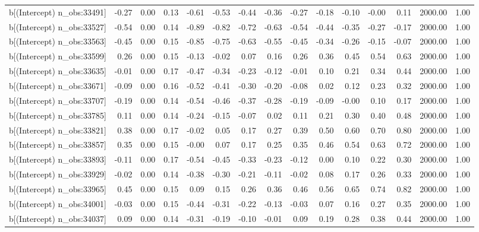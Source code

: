 \begin{table}[ht]
\begin{tabular}{rrrrrrrrrrrrrrr}
  b[(Intercept) n\_obs:33491] & -0.27 & 0.00 & 0.13 & -0.61 & -0.53 & -0.44 & -0.36 & -0.27 & -0.18 & -0.10 & -0.00 & 0.11 & 2000.00 & 1.00 \\ 
  b[(Intercept) n\_obs:33527] & -0.54 & 0.00 & 0.14 & -0.89 & -0.82 & -0.72 & -0.63 & -0.54 & -0.44 & -0.35 & -0.27 & -0.17 & 2000.00 & 1.00 \\ 
  b[(Intercept) n\_obs:33563] & -0.45 & 0.00 & 0.15 & -0.85 & -0.75 & -0.63 & -0.55 & -0.45 & -0.34 & -0.26 & -0.15 & -0.07 & 2000.00 & 1.00 \\ 
  b[(Intercept) n\_obs:33599] & 0.26 & 0.00 & 0.15 & -0.13 & -0.02 & 0.07 & 0.16 & 0.26 & 0.36 & 0.45 & 0.54 & 0.63 & 2000.00 & 1.00 \\ 
  b[(Intercept) n\_obs:33635] & -0.01 & 0.00 & 0.17 & -0.47 & -0.34 & -0.23 & -0.12 & -0.01 & 0.10 & 0.21 & 0.34 & 0.44 & 2000.00 & 1.00 \\ 
  b[(Intercept) n\_obs:33671] & -0.09 & 0.00 & 0.16 & -0.52 & -0.41 & -0.30 & -0.20 & -0.08 & 0.02 & 0.12 & 0.23 & 0.32 & 2000.00 & 1.00 \\ 
  b[(Intercept) n\_obs:33707] & -0.19 & 0.00 & 0.14 & -0.54 & -0.46 & -0.37 & -0.28 & -0.19 & -0.09 & -0.00 & 0.10 & 0.17 & 2000.00 & 1.00 \\ 
  b[(Intercept) n\_obs:33785] & 0.11 & 0.00 & 0.14 & -0.24 & -0.15 & -0.07 & 0.02 & 0.11 & 0.21 & 0.30 & 0.40 & 0.48 & 2000.00 & 1.00 \\ 
  b[(Intercept) n\_obs:33821] & 0.38 & 0.00 & 0.17 & -0.02 & 0.05 & 0.17 & 0.27 & 0.39 & 0.50 & 0.60 & 0.70 & 0.80 & 2000.00 & 1.00 \\ 
  b[(Intercept) n\_obs:33857] & 0.35 & 0.00 & 0.15 & -0.00 & 0.07 & 0.17 & 0.25 & 0.35 & 0.46 & 0.54 & 0.63 & 0.72 & 2000.00 & 1.00 \\ 
  b[(Intercept) n\_obs:33893] & -0.11 & 0.00 & 0.17 & -0.54 & -0.45 & -0.33 & -0.23 & -0.12 & 0.00 & 0.10 & 0.22 & 0.30 & 2000.00 & 1.00 \\ 
  b[(Intercept) n\_obs:33929] & -0.02 & 0.00 & 0.14 & -0.38 & -0.30 & -0.21 & -0.11 & -0.02 & 0.08 & 0.17 & 0.26 & 0.33 & 2000.00 & 1.00 \\ 
  b[(Intercept) n\_obs:33965] & 0.45 & 0.00 & 0.15 & 0.09 & 0.15 & 0.26 & 0.36 & 0.46 & 0.56 & 0.65 & 0.74 & 0.82 & 2000.00 & 1.00 \\ 
  b[(Intercept) n\_obs:34001] & -0.03 & 0.00 & 0.15 & -0.44 & -0.31 & -0.22 & -0.13 & -0.03 & 0.07 & 0.16 & 0.27 & 0.35 & 2000.00 & 1.00 \\ 
  b[(Intercept) n\_obs:34037] & 0.09 & 0.00 & 0.14 & -0.31 & -0.19 & -0.10 & -0.01 & 0.09 & 0.19 & 0.28 & 0.38 & 0.44 & 2000.00 & 1.00 \\ 

\end{tabular}
\end{table}
